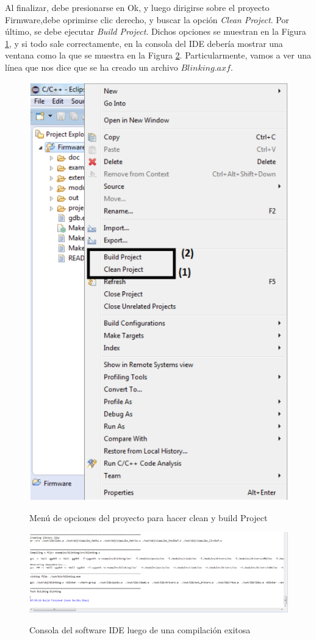 \documentclass[12pt,letterpaper]{article}
\begin{document}
Al finalizar, debe presionarse en Ok, y luego dirigirse sobre el proyecto Firmware,debe oprimirse clic derecho, y buscar la opción \textit{Clean Project}. Por último, se debe ejecutar \textit{Build Project}. Dichos opciones se muestran en la Figura  \ref{primer_proy9}, y si todo sale correctamente, en la consola del IDE debería mostrar una ventana como la que se muestra en la Figura \ref{primer_proy10}. Particularmente, vamos a ver una línea que nos dice que se ha creado un archivo \textit{$Blinking.axf$}.

\begin{center}
\begin{figure}[!h]
\centering
\includegraphics[width=5 cm]{figuras/primer_proy9.png}\\
\caption{Menú de opciones del proyecto para hacer clean y build Project}
\label{primer_proy9}
\end{figure}
\end{center}

\begin{center}
\begin{figure}[!h]
\centering
\includegraphics[width=15 cm]{figuras/primer_proy10.png}\\
\caption{Consola del software IDE luego de una compilación exitosa}
\label{primer_proy10}
\end{figure}
\end{center}
\end{document}
